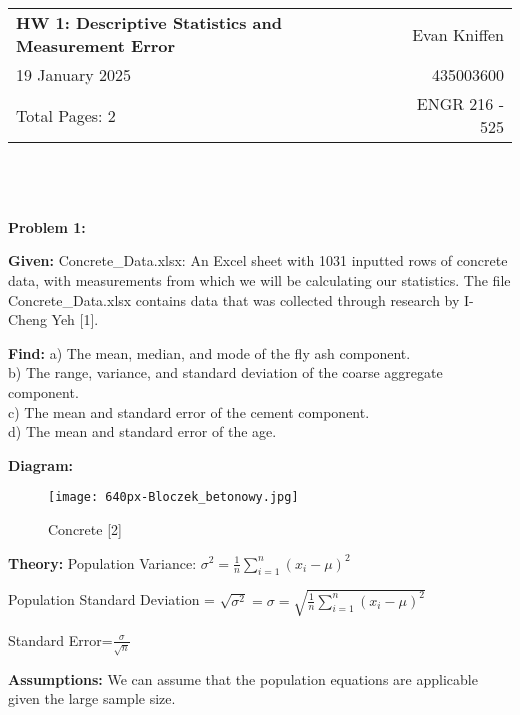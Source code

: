 \documentclass[letterpaper,11pt]{article}
\date{\vspace{-2cm}} %
\begin{document}
\pagestyle{plain}
\setlength{\parskip}{1em}
\setlength{\parindent}{0em}
\newcommand{\resumeSubheading}[6]{
  \vspace{-2pt}\item
    \begin{tabular*}{0.97\textwidth}[t]{l@{\extracolsep{\fill}}r}
      \textbf{#1} & #2 \\
       #3 & #4\\
      #5 & #6 \\
    \end{tabular*}\vspace{-7pt}
}
\resumeSubheading{HW 1: Descriptive Statistics and Measurement Error}{Evan Kniffen}{19 January 2025}{435003600}{Total Pages: 2}{ENGR 216 - 525}
\\
\\
\\
\textbf{Problem 1:}

\textbf{Given:} \linebreak
Concrete\_Data.xlsx: An Excel sheet with 1031 inputted rows of concrete data, with measurements from which we will be calculating our statistics. The file Concrete\_Data.xlsx contains data that was collected through
research by I-Cheng Yeh [1].

\textbf{Find:}\linebreak
a) The mean, median, and mode of the fly ash component. \\
b) The range, variance, and standard deviation of the coarse aggregate component.\\
c) The mean and standard error of the cement component.\\
d) The mean and standard error of the age.

\textbf{Diagram:}\linebreak
\begin{figure}[h!]
    \centering
    \texttt{[image: 640px-Bloczek\_betonowy.jpg]}
    \caption{Concrete [2]}
\end{figure}

\textbf{Theory:}\linebreak
Population Variance: \(\displaystyle\sigma^2 = \frac1n\sum_{i=1}^n(x_i-\mu)^2\)

Population Standard Deviation = \(\sqrt{\sigma^2} = \sigma = \sqrt{\displaystyle \frac1n\sum_{i=1}^n(x_i-\mu)^2}\)

Standard Error=\(\frac{\sigma}{\sqrt{n}}\)

\textbf{Assumptions:}\linebreak
We can assume that the population equations are applicable given the large sample size. 
\end{document}

